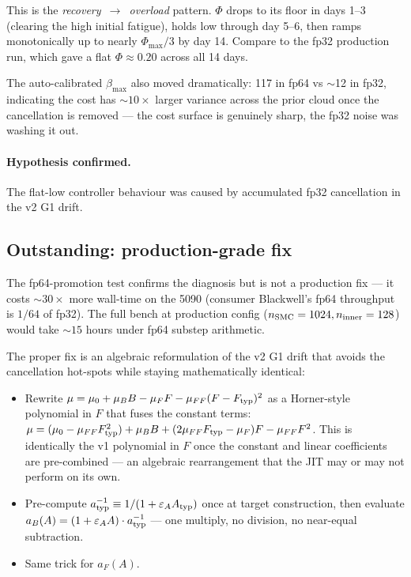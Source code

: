 \documentclass[11pt,a4paper]{article}
\begin{document}
\noindent
This is the \emph{recovery~$\to$~overload} pattern. $\Phi$ drops to
its floor in days 1--3 (clearing the high initial fatigue), holds low
through day 5--6, then ramps monotonically up to nearly $\Phi_{\max}/3$
by day 14. Compare to the fp32 production run, which gave a flat
$\Phi \approx 0.20$ across all 14 days.

The auto-calibrated $\beta_{\max}$ also moved dramatically: 117 in fp64
vs $\sim$12 in fp32, indicating the cost has $\sim 10\times$ larger
variance across the prior cloud once the cancellation is removed ---
the cost surface is genuinely sharp, the fp32 noise was washing it out.

\paragraph{Hypothesis confirmed.} The flat-low controller behaviour
was caused by accumulated fp32 cancellation in the v2 G1 drift.

\subsection{Outstanding: production-grade fix}

The fp64-promotion test confirms the diagnosis but is not a
production fix --- it costs $\sim 30\times$ more wall-time on the 5090
(consumer Blackwell's fp64 throughput is $1/64$ of fp32). The full
bench at production config ($n_{\rm SMC}=1024, n_{\rm inner}=128$)
would take $\sim 15$ hours under fp64 substep arithmetic.

The proper fix is an algebraic reformulation of the v2 G1 drift that
avoids the cancellation hot-spots while staying mathematically
identical:

\begin{itemize}[itemsep=2pt]
\item Rewrite $\mu = \mu_0 + \mu_B B - \mu_F F - \mu_{FF}(F-F_{\rm typ})^2$
  as a Horner-style polynomial in $F$ that fuses the constant terms:
  $\mu = (\mu_0 - \mu_{FF} F_{\rm typ}^2) + \mu_B B + (2\mu_{FF}F_{\rm typ} - \mu_F) F - \mu_{FF} F^2$.
  This is identically the v1 polynomial in $F$ once the constant and
  linear coefficients are pre-combined --- an algebraic rearrangement
  that the JIT may or may not perform on its own.
\item Pre-compute $a_{\rm typ}^{-1} \equiv 1/(1+\varepsilon_A A_{\rm typ})$
  once at target construction, then evaluate $a_B(A) = (1+\varepsilon_A A) \cdot a_{\rm typ}^{-1}$
  --- one multiply, no division, no near-equal subtraction.
\item Same trick for $a_F(A)$.
\end{itemize}
\end{document}
